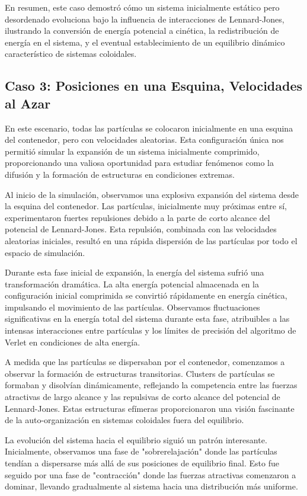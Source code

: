 \documentclass[twocolumn]{article}
\begin{document}
En resumen, este caso demostró cómo un sistema inicialmente estático pero desordenado evoluciona bajo la influencia de interacciones de Lennard-Jones, ilustrando la conversión de energía potencial a cinética, la redistribución de energía en el sistema, y el eventual establecimiento de un equilibrio dinámico característico de sistemas coloidales.

\subsection*{Caso 3: Posiciones en una Esquina, Velocidades al Azar}

En este escenario, todas las partículas se colocaron inicialmente en una esquina del contenedor, pero con velocidades aleatorias. Esta configuración única nos permitió simular la expansión de un sistema inicialmente comprimido, proporcionando una valiosa oportunidad para estudiar fenómenos como la difusión y la formación de estructuras en condiciones extremas.

Al inicio de la simulación, observamos una explosiva expansión del sistema desde la esquina del contenedor. Las partículas, inicialmente muy próximas entre sí, experimentaron fuertes repulsiones debido a la parte de corto alcance del potencial de Lennard-Jones. Esta repulsión, combinada con las velocidades aleatorias iniciales, resultó en una rápida dispersión de las partículas por todo el espacio de simulación.

Durante esta fase inicial de expansión, la energía del sistema sufrió una transformación dramática. La alta energía potencial almacenada en la configuración inicial comprimida se convirtió rápidamente en energía cinética, impulsando el movimiento de las partículas. Observamos fluctuaciones significativas en la energía total del sistema durante esta fase, atribuibles a las intensas interacciones entre partículas y los límites de precisión del algoritmo de Verlet en condiciones de alta energía.

A medida que las partículas se dispersaban por el contenedor, comenzamos a observar la formación de estructuras transitorias. Clusters de partículas se formaban y disolvían dinámicamente, reflejando la competencia entre las fuerzas atractivas de largo alcance y las repulsivas de corto alcance del potencial de Lennard-Jones. Estas estructuras efímeras proporcionaron una visión fascinante de la auto-organización en sistemas coloidales fuera del equilibrio.

La evolución del sistema hacia el equilibrio siguió un patrón interesante. Inicialmente, observamos una fase de "sobrerelajación" donde las partículas tendían a dispersarse más allá de sus posiciones de equilibrio final. Esto fue seguido por una fase de "contracción" donde las fuerzas atractivas comenzaron a dominar, llevando gradualmente al sistema hacia una distribución más uniforme.
\end{document}
